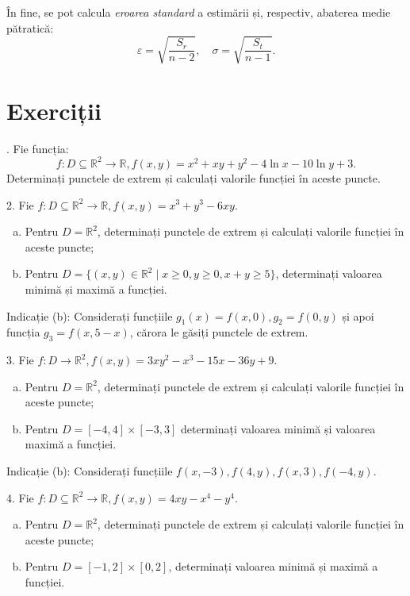 \documentclass[11pt,a4paper]{article}
\newcommand\seq{\subseteq}
\newcommand\RR{\mathbb{R}}
\theoremstyle{dotless}
\theoremstyle{dotlessdr}
\begin{document}
În fine, se pot calcula \emph{eroarea standard} a estimării și, respectiv,
abaterea medie pătratică:
\[
  \varepsilon = \sqrt{\frac{S_r}{n - 2}}, \quad \sigma = \sqrt{\frac{S_t}{n - 1}}.
\]


\section{Exerciții}
\label{sec:exc}

\indent{}. Fie funcția:
\[
  f : D \seq \RR^2 \to \RR, f(x, y) = x^2 + xy + y^2 - 4\ln x - 10 \ln y + 3.
\]
Determinați punctele de extrem și calculați valorile funcției în aceste puncte.

\vspace{1cm}

2. Fie $f : D \seq \RR^2 \to \RR, f(x, y) = x^3 + y^3 - 6xy$.
\begin{enumerate}[(a)]
\item Pentru $D = \RR^2$, determinați punctele de extrem și calculați valorile
  funcției în aceste puncte;
\item Pentru $D = \{ (x,y) \in \RR^2 \mid x \geq 0, y \geq 0, x + y \geq 5 \}$,
  determinați valoarea minimă și maximă a funcției.
\end{enumerate}

Indicație (b): Considerați funcțiile $g_1(x) = f(x,0), g_2 = f(0, y)$ și apoi
funcția $g_3 = f(x, 5-x)$, cărora le găsiți punctele de extrem.

\vspace{1cm}

3. Fie $f : D \to \RR^2, f(x, y) = 3xy^2 - x^3 - 15x - 36y + 9$.
\begin{enumerate}[(a)]
\item Pentru $D = \RR^2$, determinați punctele de extrem și calculați valorile
  funcției în aceste puncte;
\item Pentru $D = [-4, 4] \times [-3, 3]$ determinați valoarea minimă și valoarea
  maximă a funcției.
\end{enumerate}

Indicație (b): Considerați funcțiile $f(x, -3), f(4, y), f(x, 3), f(-4, y)$.

\vspace{1cm}

4. Fie $f : D \seq \RR^2 \to \RR, f(x, y) = 4xy - x^4 - y^4$.
\begin{enumerate}[(a)]
\item Pentru $D = \RR^2$, determinați punctele de extrem și calculați valorile
  funcției în aceste puncte;
\item Pentru $D = [-1, 2] \times [0, 2]$, determinați valoarea minimă și
  maximă a funcției.
\end{enumerate}
\end{document}
